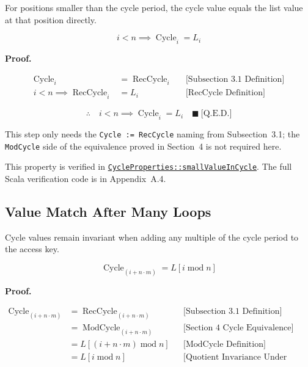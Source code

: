 For positions smaller than the cycle period, the cycle value equals the list
value at that position directly.

\begin{equation*}
i<n\implies\operatorname{Cycle}_i=L_i
\end{equation*}

\noindent\textbf{Proof.}

\begin{equation*}
\begin{aligned}
\operatorname{Cycle}_i &= \operatorname{RecCycle}_i
  && \text{[Subsection 3.1 Definition]} \\
i<n\implies\operatorname{RecCycle}_i &= L_i
  && \text{[RecCycle Definition]}
\end{aligned}
\end{equation*}

\begin{equation*}
\therefore\quad i<n\implies\operatorname{Cycle}_i=L_i
  \quad \blacksquare\ \text{[Q.E.D.]}
\end{equation*}

This step only needs the \texttt{Cycle := RecCycle} naming from
Subsection~3.1; the \texttt{ModCycle} side of the equivalence proved in
Section~4 is not required here.

This property is verified in
\href{https://github.com/thiagomata/prime-numbers/blob/cycle-article-v1.0.0/src/main/scala/v1/chapter4/cycle/properties/CycleProperties.scala}{\texttt{CycleProperties::smallValueInCycle}}.
The full Scala verification code is in Appendix~A.4.

\subsection{Value Match After Many Loops}

Cycle values remain invariant when adding any multiple of the cycle period to
the access key.

\begin{equation*}
\operatorname{Cycle}_{(i+n\cdot m)}=L[i\operatorname{mod}n]
\end{equation*}

\noindent\textbf{Proof.}

\begin{equation*}
\begin{aligned}
\operatorname{Cycle}_{(i+n\cdot m)}
  &=\operatorname{RecCycle}_{(i+n\cdot m)}
  && \text{[Subsection 3.1 Definition]} \\
  &=\operatorname{ModCycle}_{(i+n\cdot m)}
  && \text{[Section 4 Cycle Equivalence]} \\
  &=L[(i+n\cdot m)\operatorname{mod}n]
  && \text{[ModCycle Definition]} \\
  &=L[i\operatorname{mod}n]
  && \text{[Quotient Invariance Under Linear Shift by Multiplier]}
\end{aligned}
\end{equation*}

